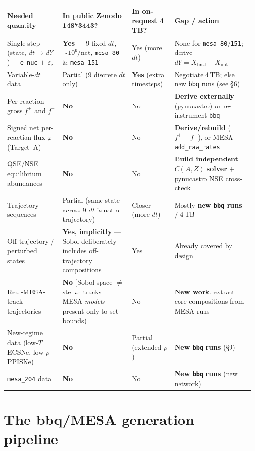 \documentclass[11pt]{article}
\newcommand{\bbq}{\texttt{bbq}}
\begin{document}
{\footnotesize\setlength{\tabcolsep}{4pt}
\begin{longtable}{p{3.4cm}p{2.9cm}p{1.8cm}p{6.3cm}}
\toprule
\textbf{Needed quantity} & \textbf{In public Zenodo 14873443?} & \textbf{In on-request 4\,TB?} & \textbf{Gap / action} \\
\midrule
\endhead
Single-step (state, $dt \to dY$) $+$ \texttt{e\_nuc} $+$ $\varepsilon_\nu$ & \textbf{Yes} --- 9 fixed $dt$, $\sim 10^6$/net, \texttt{mesa\_80} \& \texttt{mesa\_151} & Yes (more $dt$) & None for \texttt{mesa\_80}/\texttt{151}; derive $dY = X_{\mathrm{final}} - X_{\mathrm{init}}$ \\
Variable-$dt$ data & Partial (9 discrete $dt$ only) & \textbf{Yes} (extra timesteps) & Negotiate 4\,TB; else new \bbq{} runs (see \S6) \\
Per-reaction gross $f^+$ and $f^-$ & \textbf{No} & No & \textbf{Derive externally} (pynucastro) or re-instrument \bbq{} \\
Signed net per-reaction flux $\varphi$ (Target~A) & \textbf{No} & No & \textbf{Derive/rebuild} ($f^+ - f^-$), or MESA \texttt{add\_raw\_rates} \\
QSE/NSE equilibrium abundances & \textbf{No} & No & \textbf{Build independent $C(A,Z)$ solver} $+$ pynucastro NSE cross-check \\
Trajectory sequences & Partial (same state across 9 $dt$ is not a trajectory) & Closer (more $dt$) & Mostly \textbf{new \bbq{} runs} / 4\,TB \\
Off-trajectory / perturbed states & \textbf{Yes, implicitly} --- Sobol deliberately includes off-trajectory compositions & Yes & Already covered by design \\
Real-MESA-track trajectories & \textbf{No} (Sobol space $\neq$ stellar tracks; MESA \emph{models} present only to set bounds) & No & \textbf{New work}: extract core compositions from MESA runs \\
New-regime data (low-$T$ ECSNe, low-$\rho$ PPISNe) & \textbf{No} & Partial (extended $\rho$) & \textbf{New \bbq{} runs} (\S9) \\
\texttt{mesa\_204} data & \textbf{No} & No & \textbf{New \bbq{} runs} (new network) \\
\bottomrule
\end{longtable}}

\section{The bbq/MESA generation pipeline}
\end{document}

